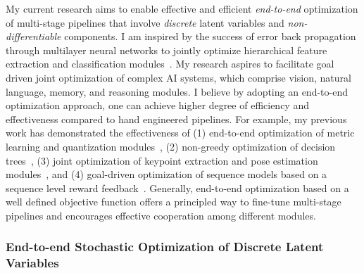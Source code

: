 \documentclass[a4paper, 10pt]{article}
\def\eg{{\em e.g.,}}
\newcommand{\figref}[1]{Figure~\ref{#1}}
\begin{document}

My current research aims to enable effective and efficient {\em
  end-to-end} optimization of multi-stage pipelines that involve {\em
  discrete} latent variables and {\em non-differentiable} components.
I am inspired by the success of error back propagation through
multilayer neural networks to jointly optimize hierarchical feature
extraction and classification modules~\cite{backprop,lecun98}.  My
research aspires to facilitate goal driven joint optimization of
complex AI systems, which comprise vision, natural language, memory,
and reasoning modules. I believe by adopting an end-to-end
optimization approach, one can achieve higher degree of efficiency and
effectiveness compared to hand engineered pipelines.  For example, my
previous work has demonstrated the effectiveness of (1) end-to-end
optimization of metric learning and quantization
modules~\cite{mlh,hdml}, (2) non-greedy optimization of decision
trees~\cite{engodt}, (3) joint optimization of keypoint extraction and
pose estimation modules~\cite{keypointnet}, and (4) goal-driven
optimization of sequence models based on a sequence level reward
feedback~\cite{mapo,ocd}. Generally, end-to-end optimization based on
a well defined objective function offers a principled way to fine-tune
multi-stage pipelines and encourages effective cooperation among
different modules.

\vspace*{-.2cm}
\subsubsection*{End-to-end Stochastic Optimization of Discrete Latent Variables}
\end{document}
